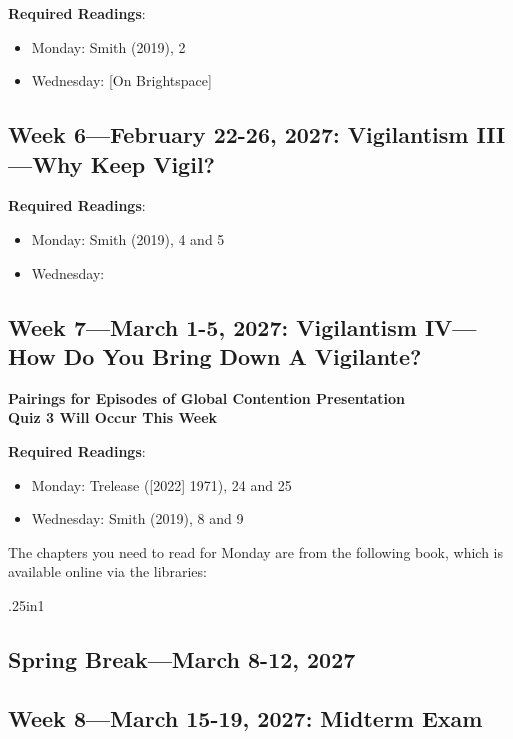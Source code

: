 \documentclass[12pt]{article}
\begin{document}
\textbf{Required Readings}:
\begin{itemize}
    \item Monday: Smith (2019), 2
    \item Wednesday:  [On Brightspace]
\end{itemize}

\subsection*{Week 6---February 22-26, 2027: Vigilantism III---Why Keep Vigil?}

\textbf{Required Readings}:
\begin{itemize}
    \item Monday: Smith (2019), 4 and 5
    \item Wednesday: 
\end{itemize}

\newpage{}
\subsection*{Week 7---March 1-5, 2027: Vigilantism IV---How Do You Bring Down A Vigilante?}
\textbf{Pairings for Episodes of Global Contention Presentation}\\
\textbf{Quiz 3 Will Occur This Week}

\textbf{Required Readings}:
\begin{itemize}
    \item Monday: Trelease ([2022] 1971), 24 and 25
    \item Wednesday: Smith (2019), 8 and 9
\end{itemize}

The chapters you need to read for Monday are from the following book, which is available online via the libraries:\\

\begin{hangparas}{.25in}{1}
\end{hangparas}
\vspace{0.25em}

\subsection*{Spring Break---March 8-12, 2027}

\subsection*{Week 8---March 15-19, 2027: Midterm Exam}
\end{document}
